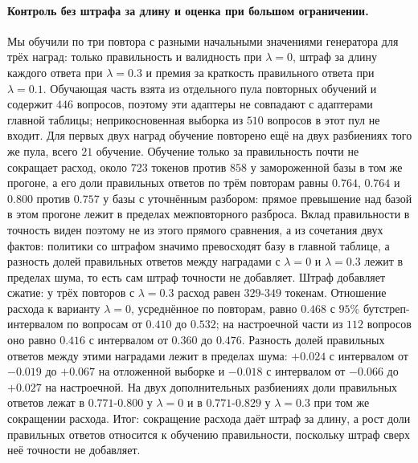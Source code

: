 \documentclass[11pt]{article}
\begin{document}
\paragraph{Контроль без штрафа за длину и оценка при большом ограничении.} Мы обучили по три повтора с разными начальными значениями генератора для трёх наград: только правильность и валидность при $\lambda=0$, штраф за длину каждого ответа при $\lambda=0.3$ и премия за краткость правильного ответа при $\lambda=0.1$. Обучающая часть взята из отдельного пула повторных обучений и содержит $446$ вопросов, поэтому эти адаптеры не совпадают с адаптерами главной таблицы; неприкосновенная выборка из $510$ вопросов в этот пул не входит. Для первых двух наград обучение повторено ещё на двух разбиениях того же пула, всего $21$ обучение. Обучение только за правильность почти не сокращает расход, около $723$ токенов против $858$ у замороженной базы в том же прогоне, а его доли правильных ответов по трём повторам равны $0.764$, $0.764$ и $0.800$ против $0.757$ у базы с уточнённым разбором: прямое превышение над базой в этом прогоне лежит в пределах межповторного разброса. Вклад правильности в точность виден поэтому не из этого прямого сравнения, а из сочетания двух фактов: политики со штрафом значимо превосходят базу в главной таблице, а разность долей правильных ответов между наградами с $\lambda=0$ и $\lambda=0.3$ лежит в пределах шума, то есть сам штраф точности не добавляет. Штраф добавляет сжатие: у трёх повторов с $\lambda=0.3$ расход равен $329$-$349$ токенам. Отношение расхода к варианту $\lambda=0$, усреднённое по повторам, равно $0.468$ с $95\%$ бутстреп-интервалом по вопросам от $0.410$ до $0.532$; на настроечной части из $112$ вопросов оно равно $0.416$ с интервалом от $0.360$ до $0.476$. Разность долей правильных ответов между этими наградами лежит в пределах шума: $+0.024$ с интервалом от $-0.019$ до $+0.067$ на отложенной выборке и $-0.018$ с интервалом от $-0.066$ до $+0.027$ на настроечной. На двух дополнительных разбиениях доли правильных ответов лежат в $0.771$-$0.800$ у $\lambda=0$ и в $0.771$-$0.829$ у $\lambda=0.3$ при том же сокращении расхода. Итог: сокращение расхода даёт штраф за длину, а рост доли правильных ответов относится к обучению правильности, поскольку штраф сверх неё точности не добавляет.
\end{document}
